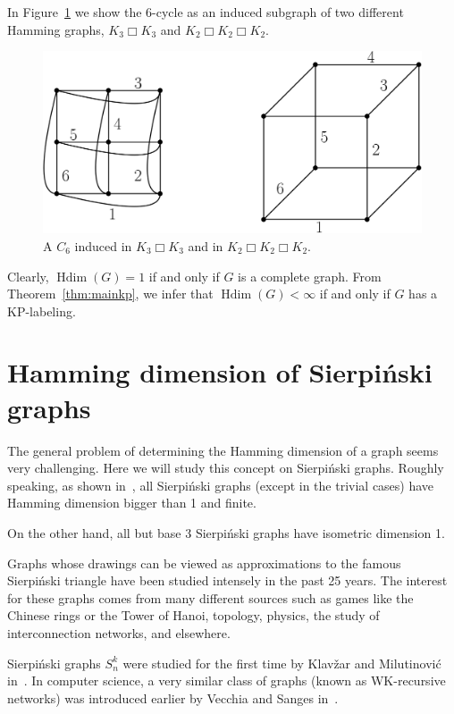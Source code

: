 \documentclass[12pt,a4paper,titlepage,openany]{report}
\DeclareMathOperator{\Hdim}{Hdim}
\begin{document}
 In Figure~\ref{fig:c6hdim} we show the 6-cycle as an induced subgraph of two different Hamming graphs, $K_3 \Box K_3$ and $K_2 \Box K_2
 \Box K_2$.

\begin{figure}[h]
\begin{center}
\includegraphics[width=1\linewidth]{figures/c_6hdim.png}
\end{center}
\caption{A $C_6$ induced in $K_3 \Box K_3$ and in $K_2 \Box K_2 \Box K_2$.}\label{fig:c6hdim}
\end{figure}

Clearly, $\Hdim ( G ) = 1$ if and only if $G$ is a complete graph. From Theorem~\ref{thm:mainkp}, we infer that $\Hdim ( G ) <\infty$ if and only if $G$ has a KP-labeling.

\section{Hamming dimension of Sierpi\' nski graphs}
The general problem of determining the Hamming dimension of a graph seems very challenging. Here we will study this concept on Sierpi\' nski graphs. Roughly speaking, as shown in~\cite{Sandi}, all Sierpi\'nski graphs (except in the trivial cases) have Hamming dimension bigger than 1 and finite.

On the other hand, all but base 3 Sierpi\'nski graphs have isometric dimension 1.

Graphs whose drawings can be viewed as approximations to the famous Sierpi\'nski triangle have been studied intensely in the past 25 years. The interest for these graphs comes from many different sources such as games like the Chinese rings or the Tower of Hanoi, topology, physics, the study of interconnection networks, and elsewhere.

Sierpi\'nski graphs $S^{k}_n$ were studied for the first time by Klav\v zar and Milutinovi\' c in~\cite{Sandi2}. In computer science, a very similar class of graphs (known as WK-recursive networks) was introduced earlier by Vecchia and Sanges in~\cite{Vecchia}.
\end{document}

